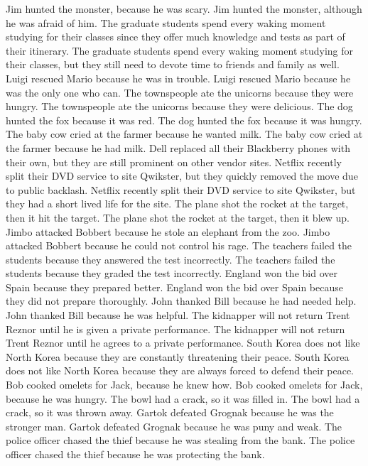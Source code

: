 \documentclass{article}
\begin{document}
\begin{enumerate}
	Jim hunted the monster, because he was scary.
	Jim hunted the monster, although he was afraid of him.
	The graduate students spend every waking moment studying for their classes since they offer much knowledge and tests as part of their itinerary.
	The graduate students spend every waking moment studying for their classes, but they still need to devote time to friends and family as well.
	Luigi rescued Mario because he was in trouble.
	Luigi rescued Mario because he was the only one who can.
	The townspeople ate the unicorns because they were hungry.
	The townspeople ate the unicorns because they were delicious.
	The dog hunted the fox because it was red.
	The dog hunted the fox because it was hungry.
	The baby cow cried at the farmer because he wanted milk.
	The baby cow cried at the farmer because he had milk.
	Dell replaced all their Blackberry phones with their own, but they are still prominent on other vendor sites.
	Netflix recently split their DVD service to site Qwikster, but they quickly removed the move due to public backlash.
	Netflix recently split their DVD service to site Qwikster, but they had a short lived life for the site.
	The plane shot the rocket at the target, then it hit the target.
	The plane shot the rocket at the target, then it blew up.
	Jimbo attacked Bobbert because he stole an elephant from the zoo.
	Jimbo attacked Bobbert because he could not control his rage.
	The teachers failed the students because they answered the test incorrectly.
	The teachers failed the students because they graded the test incorrectly.
	England won the bid over Spain because they prepared better.
	England won the bid over Spain because they did not prepare thoroughly.
	John thanked Bill because he had needed help.
	John thanked Bill because he was helpful.
	The kidnapper will not return Trent Reznor until he is given a private performance.
	The kidnapper will not return Trent Reznor until he agrees to a private performance.
	South Korea does not like North Korea because they are constantly threatening their peace.
	South Korea does not like North Korea because they are always forced to defend their peace.
	Bob cooked omelets for Jack, because he knew how.
	Bob cooked omelets for Jack, because he was hungry.
	The bowl had a crack, so it was filled in.
	The bowl had a crack, so it was thrown away.
	Gartok defeated Grognak because he was the stronger man.
	Gartok defeated Grognak because he was puny and weak.
	The police officer chased the thief because he was stealing from the bank.
	The police officer chased the thief because he was protecting the bank.

\end{enumerate}
\end{document}
